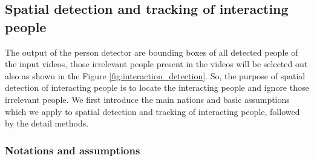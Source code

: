 \subsection{Spatial detection and tracking of interacting people}
\label{locate_interacting_people}
The output of the person detector are bounding boxes of all detected people of the input videos, those irrelevant people present in the videos will be selected out also as shown in the Figure \ref{fig:interaction_detection}.  So, the purpose of spatial detection of interacting people is to locate the interacting people and ignore those irrelevant people. We first introduce the main nations and basic assumptions which we apply to spatial detection and tracking of interacting people, followed by the detail methods. 

\subsubsection*{Notations and assumptions}
